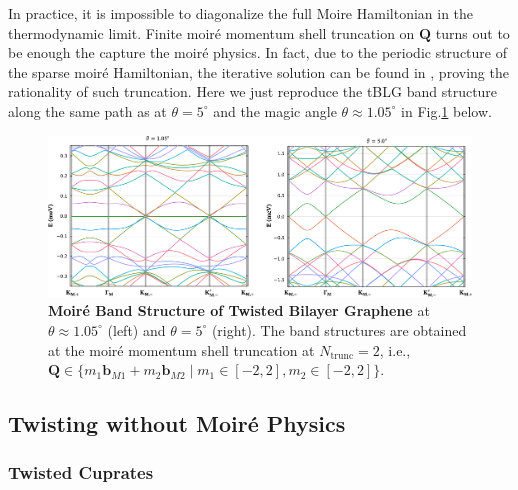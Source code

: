 In practice, it is impossible to diagonalize the full Moire Hamiltonian in the thermodynamic limit. Finite moir\'e momentum shell truncation on $\bm Q$ turns out to be enough the capture the moir\'e physics. In fact, due to the periodic structure of the sparse moir\'e Hamiltonian, the iterative solution can be found in \cite{bernevig2021twisted,song2021twisted}, proving the rationality of such truncation. Here we just reproduce the tBLG band structure along the same path as \cite{bistritzer2011moire} at $\theta=5^\circ$ and the magic angle $\theta\approx1.05^\circ$ in Fig.\ref{fig:tBLG_band} below.

\begin{figure}[!htp]
    \centering
    \includegraphics[width=1.0\textwidth]{figures/tBLG_band.pdf}
    \caption{\textbf{Moir\'e Band Structure of Twisted Bilayer Graphene} at $\theta\approx1.05^\circ$ (left) and $\theta=5^\circ$ (right). The band structures are obtained at the moir\'e momentum shell truncation at $N_{\text{trunc}}=2$, i.e., $\bm Q\in\{m_1\bm b_{M1}+m_2\bm b_{M2}\mid m_1\in[-2,2], m_2\in[-2,2]\}$.}
    \label{fig:tBLG_band}
\end{figure}






\subsection{Twisting without Moir\'{e} Physics}
\subsubsection{Twisted Cuprates}


